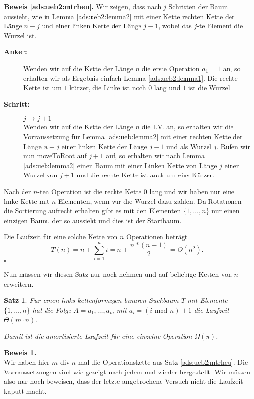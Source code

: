 \documentclass[11pt,a4paper,ngerman]{article}
\newtheorem{propo}{Satz}
\begin{document}
{\noindent\textbf{Beweis \ref{ads:ueb2:mtrheu}.}
Wir zeigen, dass nach $j$ Schritten der Baum aussieht, wie in Lemma \ref{ads:ueb2:lemma2} mit einer Kette rechten Kette der Länge $n-j$ und einer linken Kette
der Länge $j-1$, wobei das $j$-te Element die Wurzel ist.
\begin{description}
   \item[\bfseries Anker:] Wenden wir auf die Kette der Länge $n$ die erste Operation $a_1 = 1$ an, so erhalten wir als Ergebnis einfach
         Lemma \ref{ads:ueb2:lemma1}. Die rechte Kette ist um $1$ kürzer, die Linke ist noch $0$ lang und $1$ ist die Wurzel.
   \item[\bfseries Schritt:] $j \rightarrow j+1$\\
         Wenden wir auf die Kette der Länge $n$ die I.V. an, so erhalten wir die Vorraussetzung für Lemma \ref{ads:ueb:lemma2}
         mit einer rechten Kette der Länge $n-j$ einer linken Kette der Länge $j-1$ und als Wurzel $j$. Rufen wir nun moveToRoot auf $j+1$ auf,
         so erhalten wir nach Lemma \ref{ads:ueb:lemma2} einen Baum mit einer Linken Kette von Länge $j$ einer Wurzel von $j+1$ und die rechte Kette ist auch
         um eins Kürzer.
\end{description}
Nach der $n$-ten Operation ist die rechte Kette $0$ lang und wir haben nur eine linke Kette mit $n$ Elementen, wenn wir die Wurzel dazu zählen. Da Rotationen
die Sortierung aufrecht erhalten gibt es mit den Elementen $\{1, \ldots , n\}$ nur einen einzigen Baum, der so aussieht und dies ist der Startbaum.

Die Laufzeit für eine solche Kette von $n$ Operationen beträgt
$$
   T(n) = n + \sum_{i=1}^n i = n + \frac{n*(n-1)}{2} = \Theta(n^2).
$$
\mbox{}\hfill$\square$

Nun müssen wir diesen Satz nur noch nehmen und auf beliebige Ketten von $n$ erweitern.

\begin{propo} \label{ads:ueb2:mtrheuend}
   Für einen links-kettenförmigen binären Suchbaum $T$ mit Elemente $\{1, \ldots, n\}$ hat die Folge
   $A = a_1, \ldots, a_m$ mit $a_i = (i \text{ mod } n) + 1$ die Laufzeit $\Theta(m \cdot n)$.

   Damit ist die amortisierte Laufzeit für eine einzelne Operation $\Omega(n)$.
\end{propo}

\noindent\textbf{Beweis \ref{ads:ueb2:mtrheuend}.}\\
   Wir haben hier $m \text{ div } n$ mal die Operationskette aus Satz \ref{ads:ueb2:mtrheu}. Die Vorraussetzungen sind wie gezeigt nach jedem mal wieder hergestellt.
   Wir müssen also nur noch beweisen, dass der letzte angebrochene Versuch nicht die Laufzeit kaputt macht.

}
\end{document}
